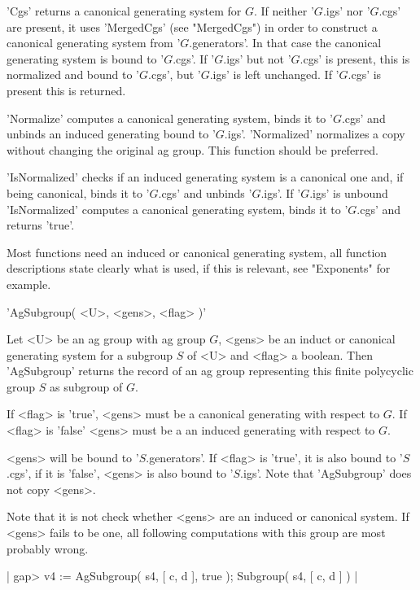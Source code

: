 'Cgs' returns   a canonical   generating  system  for  $G$.    If neither
'$G$.igs'  nor '$G$.cgs'   are   present,   it   uses   'MergedCgs'  (see
"MergedCgs")  in order to  construct a canonical  generating  system from
'$G$.generators'.  In that case the canonical generating  system is bound
to '$G$.cgs'.   If  '$G$.igs' but  not  '$G$.cgs'   is present,  this  is
normalized and bound  to '$G$.cgs', but  '$G$.igs' is left unchanged.  If
'$G$.cgs' is present this is returned.

'Normalize' computes a canonical generating system, binds it to '$G$.cgs'
and  unbinds an  induced  generating bound   to  '$G$.igs'.  'Normalized'
normalizes a copy without changing  the  original ag group. This function
should be preferred.

'IsNormalized' checks if an induced generating system is a  canonical one
and, if being canonical, binds it to '$G$.cgs' and unbinds '$G$.igs'.  If
'$G$.igs'  is  unbound  'IsNormalized'  computes  a  canonical generating
system, binds it to '$G$.cgs' and returns 'true'.

Most functions need   an  induced or  canonical   generating system,  all
function descriptions state  clearly what  is used,  if this is relevant,
see "Exponents" for example.


'AgSubgroup( <U>, <gens>, <flag> )'

Let <U> be an   ag group with ag  group  $G$, <gens>   be  an  induct  or
canonical  generating  system  for a subgroup   $S$  of <U> and  <flag> a
boolean.   Then  'AgSubgroup'   returns   the record   of   an  ag  group
representing this finite polycyclic group $S$ as subgroup of $G$.

If <flag> is 'true',  <gens> must be  a canonical generating with respect
to $G$.  If <flag> is 'false' <gens> must be a an induced generating with
respect to $G$.

<gens>  will be bound  to '$S$.generators'.  If <flag> is  'true', it  is
also bound to  '$S$.cgs', if  it  is 'false',   <gens>  is also  bound to
'$S$.igs'.  Note that 'AgSubgroup' does not copy <gens>.

Note that it  is not  check whether <gens>   are an induced  or canonical
system.  If <gens> fails to be one, all  following computations with this
group are most probably wrong.

|    gap> v4 := AgSubgroup( s4, [ c, d ], true );
    Subgroup( s4, [ c, d ] ) |

